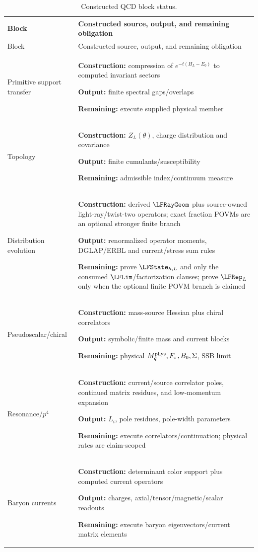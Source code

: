 \documentclass[12pt,a4paper]{article}
\begin{document}
\begin{longtable}{@{}>{\raggedright\arraybackslash}p{} >{\raggedright\arraybackslash}p{}@{}}
\caption[Constructed QCD block status]{Constructed QCD block status.}\label{p11:tab:constructed-block-status}\\
\toprule
Block & Constructed source, output, and remaining obligation \\
\midrule
\endfirsthead
\toprule
Block & Constructed source, output, and remaining obligation \\
\midrule
\endhead
Primitive support transfer & \textbf{Construction:} compression of \(e^{-t(H_L-E_0)}\) to computed invariant sectors\par\textbf{Output:} finite spectral gaps/overlaps\par\textbf{Remaining:} execute supplied physical member  \\
Topology & \textbf{Construction:} \(Z_L(\theta)\), charge distribution and covariance\par\textbf{Output:} finite cumulants/susceptibility\par\textbf{Remaining:} admissible index/continuum measure  \\
Distribution evolution & \textbf{Construction:} derived \(\LFRayGeom\) plus source-owned light-ray/twist-two operators; exact fraction POVMs are an optional stronger finite branch\par\textbf{Output:} renormalized operator moments, DGLAP/ERBL and current/stress sum rules\par\textbf{Remaining:} prove \(\LFState_{h,L}\) and only the consumed \(\LFLim\)/factorization clauses; prove \(\LFRep_L\) only when the optional finite POVM branch is claimed  \\
Pseudoscalar/chiral & \textbf{Construction:} mass-source Hessian plus chiral correlators\par\textbf{Output:} symbolic/finite mass and current blocks\par\textbf{Remaining:} physical \(M_q^{\rm phys},F_\pi,B_0,\Sigma\), SSB limit  \\
Resonance/\(p^4\) & \textbf{Construction:} current/source correlator poles, continued matrix residues, and low-momentum expansion\par\textbf{Output:} \(L_i\), pole residues, pole-width parameters\par\textbf{Remaining:} execute correlators/continuation; physical rates are claim-scoped  \\
Baryon currents & \textbf{Construction:} determinant color support plus computed current operators\par\textbf{Output:} charges, axial/tensor/magnetic/scalar readouts\par\textbf{Remaining:} execute baryon eigenvectors/current matrix elements  \\

\end{longtable}
\end{document}
